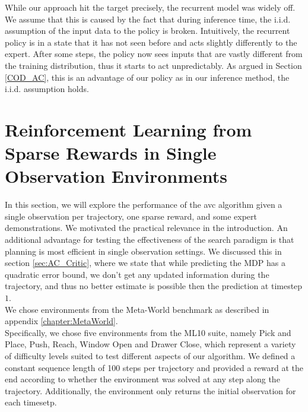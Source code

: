While our approach hit the target precisely, the recurrent model was widely off. We assume that this is caused by the fact that during inference 
time, the
i.i.d. assumption of the input data to the policy is broken. Intuitively, the recurrent policy
is in a state that it has not seen before and acts slightly differently to the expert. After some steps, the policy now sees 
inputs that are vastly
different from the training distribution, thus it starts to act unpredictably. As argued in Section \ref{COD_AC}, this is an advantage of our 
policy as in our inference method, the i.i.d. assumption holds.

\section{Reinforcement Learning from Sparse Rewards in Single Observation Environments}
In this section, we will explore the performance of the \ac{avc} algorithm given a single observation per trajectory, one sparse reward, and some expert demonstrations.
We motivated the practical relevance in the introduction. An additional advantage for testing the effectiveness of the search paradigm is that planning is most efficient in
single observation settings.
We discussed this in section \ref{sec:AC_Critic}, where we state that while predicting the MDP has a quadratic error bound, we don't get any updated information
during the trajectory, and thus no better estimate is possible then the prediction at timestep $1$. \\

We chose environments from the Meta-World benchmark as described in appendix \ref{chapter:MetaWorld}. \\

Specifically, we chose five environments from the ML10 suite, namely Pick and Place, Push, Reach, Window Open and Drawer Close, which represent a variety
of difficulty levels suited to test different aspects of our algorithm. We defined a constant sequence length of 100 steps per trajectory and provided
a reward at the end according to whether the environment was solved at any step along the trajectory. Additionally, the environment
only returns the initial observation for each timesetp.\\

